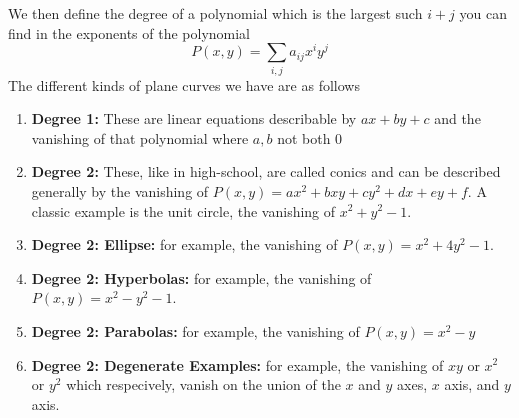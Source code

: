 \documentclass[11pt,a4paper]{article}
\theoremstyle{plain}
\theoremstyle{definition}
\theoremstyle{remark}
\begin{document}
\medskip
\noindent
We then define the degree of a polynomial which is the largest such $i+j$ you can find in the exponents of the polynomial $$P(x,y) = \sum_{i,j}a_{ij}x^iy^j$$ The different kinds of plane curves we have are as follows \begin{enumerate}
    \item \textbf{Degree 1:} These are linear equations describable by $ax+by+c$ and the vanishing of that polynomial where $a, b$ not both $0$
    \item \textbf{Degree 2:} These, like in high-school, are called conics and can be described generally by the vanishing of $P(x,y) = ax^2+bxy+cy^2+dx+ey+f$. A classic example is the unit circle, the vanishing of $x^2+y^2-1$. 
    \item \textbf{Degree 2: Ellipse:} for example, the vanishing of $P(x,y) = x^2+4y^2-1$.
    \item \textbf{Degree 2: Hyperbolas:} for example, the vanishing of $P(x,y) = x^2-y^2-1$.
    \item \textbf{Degree 2: Parabolas:} for example, the vanishing of $P(x,y) = x^2-y$ 
    \item \textbf{Degree 2: Degenerate Examples:} for example, the vanishing of $xy$ or $x^2$ or $y^2$ which respecively, vanish on the union of the $x$ and $y$ axes, $x$ axis, and $y$ axis. 
\end{enumerate}
\end{document}
